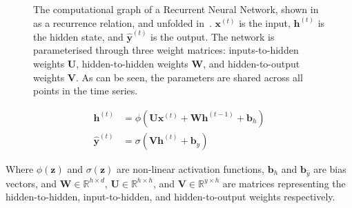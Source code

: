 \begin{figure}
  \centering
  \hspace{1cm}
  \caption[Recurrent Neural Network architecture]{%
    The computational graph of a Recurrent Neural Network, shown in~\protect{} as a recurrence relation, and unfolded in~\protect{}. $\bm{x}^{(t)}$ is the input, $\bm{h}^{(t)}$ is the hidden state, and $\bm{\hat{y}}^{(t)}$ is the output. The network is parameterised through three weight matrices: inputs-to-hidden weights $\bm{U}$, hidden-to-hidden weights $\bm{W}$, and hidden-to-output weights $\bm{V}$. As can be seen, the parameters are shared across all points in the time series.%
  }%
  \label{fig:rnn}
\end{figure}

\begin{align}
  \bm{h}^{(t)} &= \phi \left( \bm{U} \bm{x}^{(t)} + \bm{W} \bm{h}^{(t-1)} + \bm{b}_h \right) \\
  \bm{\hat{y}}^{(t)} &= \sigma \left( \bm{V} \bm{h}^{(t)} + \bm{b}_{\hat{y}} \right)
\end{align}

Where $\phi(\bm{z})$ and $\sigma(\bm{z})$ are non-linear activation functions, $\bm{b}_h$ and $\bm{b}_{\hat{y}}$ are bias vectors, and $\bm{W} \in \mathbb{R}^{h \times d}$, $\bm{U} \in \mathbb{R}^{h \times h}$, and $\bm{V} \in \mathbb{R}^{y \times h}$ are matrices representing the hidden-to-hidden, input-to-hidden, and hidden-to-output weights respectively.

